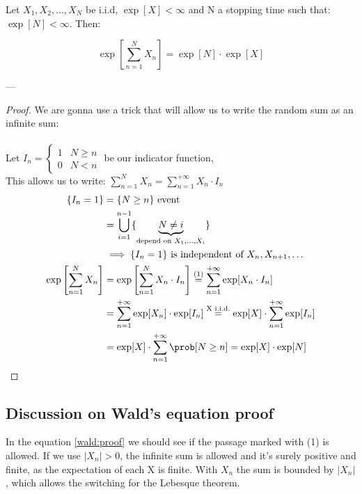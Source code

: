 \begin{theorem}
	Let $X_1, X_2, \dots, X_N $ be i.i.d, $\exp[X] < \infty$ and N a stopping time such that: $\exp[N] < \infty$. Then:

	\begin{equation}
		\exp\left[\sum\limits_{n=1}^N X_n \right] = \exp[N] \cdot \exp[X]
	\end{equation}
\end{theorem}
---
\begin{proof}
	We are gonna use a trick that will allow us to write the random sum as an infinite sum:\\ \\
	Let $I_n = \begin{cases} 1 & N \ge n \\ 0 & N<n \end{cases}$ \quad be our indicator function,\\
	This allows us to write: $\sum\limits_{n=1}^N X_n = \sum\limits_{n=1}^{+\infty} X_n \cdot I_n$
	\begin{equation}\begin{split} \label{wald:proof}
		\{I_n=1\} &= \{N \ge n \} \text{ event}\\
		&= \bigcup\limits_{i=1}^{n-1}\{\underbrace{N \neq i}_{\text{depend on } X_1, \dots, X_i} \} \\
		&\implies \{I_n=1\} \text{ is independent of }X_n, X_{n+1}, \dots\\
		\exp\left[\sum\limits_{n=1}^{N}X_n\right] &= \exp\left[\sum\limits_{n=1}^{N}X_n \cdot I_n \right] \stackrel{(1)}{=} \sum\limits_{n=1}^{+\infty}\exp[X_n \cdot I_n] \\
		&=\sum\limits_{n=1}^{+\infty}\exp[X_n] \cdot \exp[I_n] \stackrel{\text{X i.i.d.}}{=} \exp[X]\cdot\sum\limits_{n=1}^{+\infty}\exp[I_n] \\
		&= \exp[X] \cdot \sum\limits_{n=1}^{+\infty}\prob[N \ge n] = \exp[X] \cdot \exp[N]
	\end{split}\end{equation}
\end{proof}

\subsection{Discussion on Wald's equation proof}
	In the equation \ref{wald:proof} we should see if the passage marked with (1) is allowed.
	If we use $|X_n|>0$, the infinite sum is allowed and it's surely positive and finite, as the expectation of each X is finite.
	With $X_n$ the sum is bounded by $|X_n|$, which allows the switching for the Lebesque theorem.

